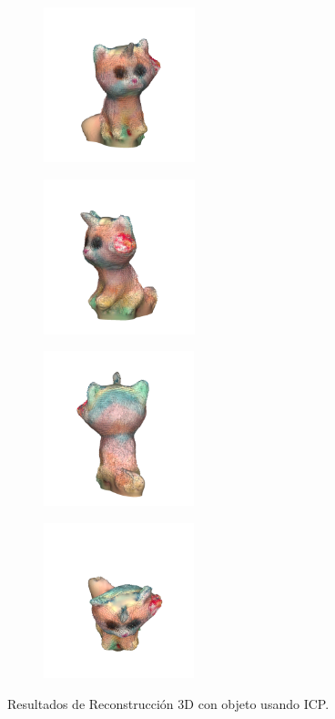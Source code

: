 \begin{figure}[h]
\begin{subfigure}[t]{0.2\textheight}
    \end{subfigure}
    \begin{subfigure}[t]{0.2\textheight}
    	\centering
        \includegraphics[height=4.5cm]{archivos/experimentacion-2-resultado-malla.png}
    \end{subfigure}
    \begin{subfigure}[t]{0.2\textheight}
    	\centering
        \includegraphics[height=4.5cm]{archivos/experimentacion-2-resultado-malla-2.png}
    \end{subfigure}
    \begin{subfigure}[t]{0.2\textheight}
    	\centering
        \includegraphics[height=4.5cm]{archivos/experimentacion-2-resultado-malla-3.png}
    \end{subfigure}
    \begin{subfigure}[t]{0.2\textheight}
    	\centering
        \includegraphics[height=4.5cm]{archivos/experimentacion-2-resultado-malla-4.png}
    \end{subfigure}
    \caption{Resultados de Reconstrucción 3D con objeto usando ICP.}
    \label{fig:resultados-reconstruccion-objeto-icp}
\end{figure}


